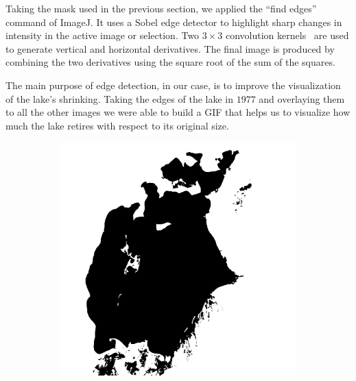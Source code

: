 Taking the mask used in the previous section, we applied the “find edges” command of ImageJ. 
It uses a Sobel edge detector to highlight sharp changes in intensity in the active image or selection. 
Two $3 \times 3$ convolution kernels~\cite{edges} are used to generate vertical and horizontal derivatives.
The final image is produced by combining the two derivatives using the square root of the sum of the squares.

The main purpose of edge detection, in our case, is to improve the visualization of the lake's shrinking. 
Taking the edges of the lake in $1977$ and overlaying them to all the other images we were able to build a GIF that helps us to visualize how much the lake retires with respect to its original size.
\begin{figure}[H]
    \centering
    \begin{subfigure}[b]{.45\textwidth}
        \includegraphics[width=\textwidth]{../img/mask.jpg}
        \caption{}
    \end{subfigure}
    \begin{subfigure}[b]{.45\textwidth}

\end{subfigure}
\end{figure}
